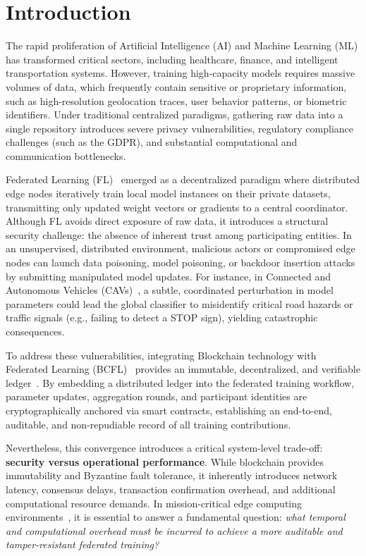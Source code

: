 \section{Introduction}
\label{sec:introduccion}

The rapid proliferation of Artificial Intelligence (AI) and Machine Learning (ML) has transformed critical sectors, including healthcare, finance, and intelligent transportation systems. However, training high-capacity models requires massive volumes of data, which frequently contain sensitive or proprietary information, such as high-resolution geolocation traces, user behavior patterns, or biometric identifiers. Under traditional centralized paradigms, gathering raw data into a single repository introduces severe privacy vulnerabilities, regulatory compliance challenges (such as the GDPR), and substantial computational and communication bottlenecks.

Federated Learning (FL)~\cite{mcmahan2017federated} emerged as a decentralized paradigm where distributed edge nodes iteratively train local model instances on their private datasets, transmitting only updated weight vectors or gradients to a central coordinator. Although FL avoids direct exposure of raw data, it introduces a structural security challenge: the absence of inherent trust among participating entities. In an unsupervised, distributed environment, malicious actors or compromised edge nodes can launch data poisoning, model poisoning, or backdoor insertion attacks~\cite{bagdasaryan2020backdoor} by submitting manipulated model updates. For instance, in Connected and Autonomous Vehicles (CAVs)~\cite{chellapandi2024federated}, a subtle, coordinated perturbation in model parameters could lead the global classifier to misidentify critical road hazards or traffic signals (e.g., failing to detect a STOP sign), yielding catastrophic consequences.

To address these vulnerabilities, integrating Blockchain technology with Federated Learning (BCFL)~\cite{qu2022blockchain} provides an immutable, decentralized, and verifiable ledger~\cite{nakamoto2008bitcoin, zheng2018blockchain}. By embedding a distributed ledger into the federated training workflow, parameter updates, aggregation rounds, and participant identities are cryptographically anchored via smart contracts, establishing an end-to-end, auditable, and non-repudiable record of all training contributions.

Nevertheless, this convergence introduces a critical system-level trade-off: \textbf{security versus operational performance}. While blockchain provides immutability and Byzantine fault tolerance, it inherently introduces network latency, consensus delays, transaction confirmation overhead, and additional computational resource demands. In mission-critical edge computing environments~\cite{liu2019edge}, it is essential to answer a fundamental question: \textit{what temporal and computational overhead must be incurred to achieve a more auditable and tamper-resistant federated training?}

